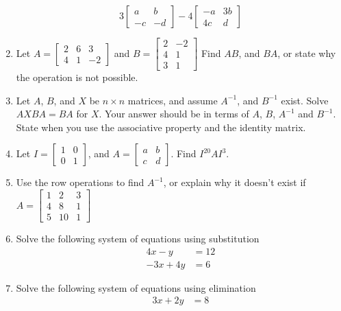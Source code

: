 \documentclass{article}
\begin{document}
\begin{enumerate}
        \[3\begin{bmatrix}
        a & b \\
        -c & -d
        \end{bmatrix} -4
        \begin{bmatrix}
        -a & 3b \\
        4c  & d
        \end{bmatrix}\]
        \item Let $A=\begin{bmatrix}
        2 & 6 & 3 \\
        4 & 1 & -2
        \end{bmatrix}$ and $B=\begin{bmatrix}
        2 & -2 \\
        4 & 1 \\
        3 & 1
        \end{bmatrix}$
        Find $AB$, and $BA$, or state why the operation is not possible.
        \item Let $A$, $B$, and $X$ be $n \times n$ matrices, and assume $A^{-1}$, and $B^{-1}$ exist.  Solve $AXBA=BA$ for $X$.  Your answer should be in terms of $A$, $B$, $A^{-1}$ and $B^{-1}$.  State when you use the associative property and the identity matrix.
        \item Let $I=\begin{bmatrix} 1 & 0 \\ 0 & 1 \end{bmatrix}$, and $A=\begin{bmatrix} a & b \\ c & d \end{bmatrix}$.  Find $I^{20}AI^{3}$.
        \item Use the row operations to find $A^{-1}$, or explain why it doesn't exist if $A= \begin{bmatrix} 1 & 2 & 3 \\ 4 & 8 & 1 \\ 5 & 10 & 1 \end{bmatrix}$
        \item Solve the following system of equations using substitution
        \begin{align*}
        4x-y &= 12 \\
        -3x+4y &= 6
        \end{align*}
        \item  Solve the following system of equations using elimination
        \begin{align*}
            3x+2y &= 8 \\

\end{align*}
\end{enumerate}
\end{document}
